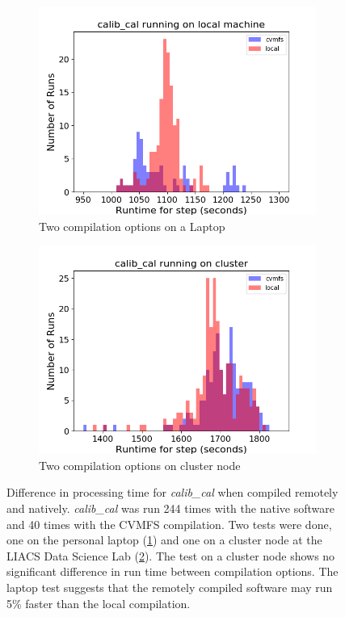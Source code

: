 \begin{figure}
  \centering
     \begin{subfigure}{.45\linewidth}
    \includegraphics[width=\linewidth]{ch4/figures/ppr2_calib_local.png}
    \caption{Two compilation options on a Laptop}
	\label{fig:ch4_cmvfs1_calib}
    \end{subfigure}%
    \begin{subfigure}{.45\linewidth}
     \includegraphics[width=\linewidth]{ch4/figures/ppr2_calib_cluster.png}
    \caption{Two compilation options on cluster node}
	\label{fig:ch4_cmvfs2_calib}
    \end{subfigure}%
      \caption[Speed comparison between natively and remotely compiled software for the 'calib\_cal' step.]{Difference in processing time for \textit{calib\_cal} when compiled remotely and natively. \textit{calib\_cal} was run 244 times with the native software and 40 times with the CVMFS compilation. Two tests were done, one on the personal laptop (\ref{fig:ch4_cmvfs1_calib}) and one on a cluster node at the LIACS Data Science Lab (\ref{fig:ch4_cmvfs2_calib}). The test on a cluster node shows no significant difference in run time between compilation options. The laptop test suggests that the remotely compiled software may run 5\% faster than the local compilation. } 
	\label{fig:ch4_cvmfs_native}
\end{figure}



